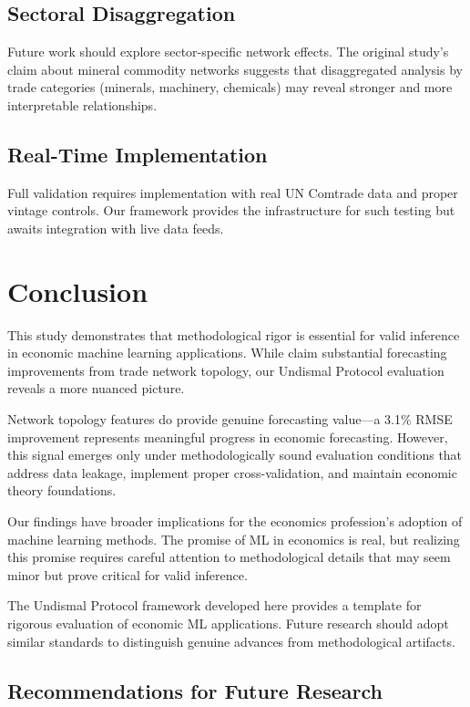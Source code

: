 \documentclass[11pt,a4paper]{article}
\begin{document}
\subsection{Sectoral Disaggregation}

Future work should explore sector-specific network effects. The original study's claim about mineral commodity networks suggests that disaggregated analysis by trade categories (minerals, machinery, chemicals) may reveal stronger and more interpretable relationships.

\subsection{Real-Time Implementation}

Full validation requires implementation with real UN Comtrade data and proper vintage controls. Our framework provides the infrastructure for such testing but awaits integration with live data feeds.

\section{Conclusion}

This study demonstrates that methodological rigor is essential for valid inference in economic machine learning applications. While \citet{silva2024machine} claim substantial forecasting improvements from trade network topology, our Undismal Protocol evaluation reveals a more nuanced picture.

Network topology features do provide genuine forecasting value—a 3.1\% RMSE improvement represents meaningful progress in economic forecasting. However, this signal emerges only under methodologically sound evaluation conditions that address data leakage, implement proper cross-validation, and maintain economic theory foundations.

Our findings have broader implications for the economics profession's adoption of machine learning methods. The promise of ML in economics is real, but realizing this promise requires careful attention to methodological details that may seem minor but prove critical for valid inference.

The Undismal Protocol framework developed here provides a template for rigorous evaluation of economic ML applications. Future research should adopt similar standards to distinguish genuine advances from methodological artifacts.

\subsection{Recommendations for Future Research}
\end{document}
